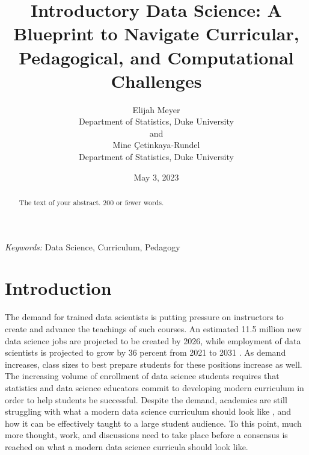 \documentclass[
  12pt]{article}
\begin{document}
\def\spacingset#1{\renewcommand{\baselinestretch}%
{#1}\small\normalsize} \spacingset{1}



\date{May 3, 2023}
\title{\bf Introductory Data Science: A Blueprint to Navigate
Curricular, Pedagogical, and Computational Challenges}
\author{
Elijah Meyer\\
Department of Statistics, Duke University\\
and\\Mine Çetinkaya-Rundel\\
Department of Statistics, Duke University\\
}
\maketitle

\bigskip
\bigskip
\begin{abstract}
The text of your abstract. 200 or fewer words.
\end{abstract}

\noindent%
{\it Keywords:} Data Science, Curriculum, Pedagogy
\vfill

\newpage
\spacingset{1.9} %
\ifdefined\Shaded\renewenvironment{Shaded}{\begin{tcolorbox}[sharp corners, boxrule=0pt, frame hidden, borderline west={3pt}{0pt}{shadecolor}, enhanced, interior hidden, breakable]}{\end{tcolorbox}}\fi

\hypertarget{introduction}{%
\section{Introduction}\label{introduction}}

The demand for trained data scientists is putting pressure on
instructors to create and advance the teachings of such courses. An
estimated 11.5 million new data science jobs are projected to be created
by 2026, while employment of data scientists is projected to grow by 36
percent from 2021 to 2031 \citep{labor_2022}. As demand increases, class
sizes to best prepare students for these positions increase as well. The
increasing volume of enrollment of data science students
\citep{Redmond2022} requires that statistics and data science educators
commit to developing modern curriculum in order to help students be
successful. Despite the demand, academics are still struggling with what
a modern data science curriculum should look like \citep{Schwab2020},
and how it can be effectively taught to a large student audience. To
this point, much more thought, work, and discussions need to take place
before a consensus is reached on what a modern data science curricula
should look like.
\end{document}
